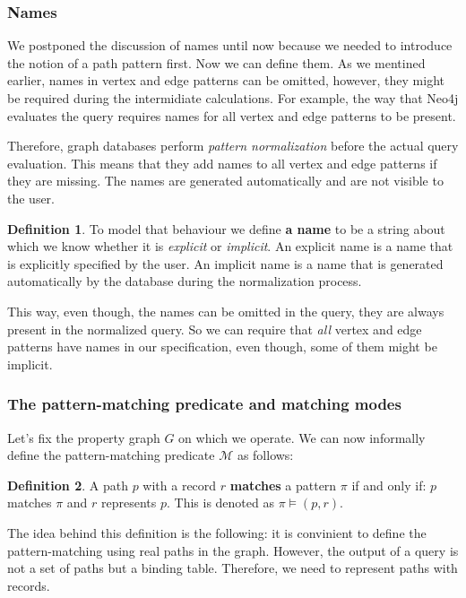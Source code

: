 \documentclass[14pt]{constructor-thesis}
\theoremstyle{definition}
\newtheorem*{definition}{Definition}
\begin{document}
\subsubsection{Names}

We postponed the discussion of names until now because we needed to introduce the notion of a path pattern first. Now we can define them. As we mentined earlier, names in vertex and edge patterns can be omitted, however, they might be required during the intermidiate calculations. For example, the way that Neo4j evaluates the query requires names for all vertex and edge patterns to be present. 

Therefore, graph databases perform \textit{pattern normalization} before the actual query evaluation. This means that they add names to all vertex and edge patterns if they are missing. The names are generated automatically and are not visible to the user.

\begin{definition}
  To model that behaviour we define \textbf{a name} to be a string about which we know whether it is \textit{explicit} or \textit{implicit}. An explicit name is a name that is explicitly specified by the user. An implicit name is a name that is generated automatically by the database during the normalization process.
\end{definition}

This way, even though, the names can be omitted in the query, they are always present in the normalized query. So we can require that \textit{all} vertex and edge patterns have names in our specification, even though, some of them might be implicit.

\subsubsection{The pattern-matching predicate and matching modes}

Let's fix the property graph $G$ on which we operate. We can now informally define the pattern-matching predicate $\mathcal{M}$ as follows:

\begin{definition}
   A path $p$ with a record $r$ \textbf{matches} a pattern $\pi$ if and only if: $p$ matches $\pi$ and $r$ represents $p$. This is denoted as $\pi \models (p, r)$.
\end{definition}

The idea behind this definition is the following: it is convinient to define the pattern-matching using real paths in the graph. However, the output of a query is not a set of paths but a binding table. Therefore, we need to represent paths with records.
\end{document}
